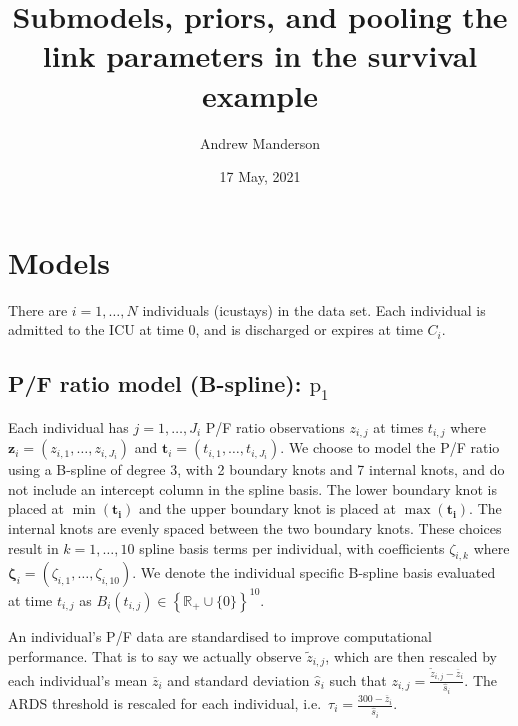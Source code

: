 \documentclass[
  10pt,
  a4paper,
]{article}
\title{Submodels, priors, and pooling the link parameters in the
survival example}
\author{Andrew Manderson}
\date{17 May, 2021}
\newcommand{\pd}{\text{p}}
\begin{document}
\maketitle

\hypertarget{models}{%
\section{Models}\label{models}}

There are \(i = 1, \ldots, N\) individuals (icustays) in the data set.
Each individual is admitted to the ICU at time \(0\), and is discharged
or expires at time \(C_{i}\).

\hypertarget{pf-ratio-model-b-spline-pd_1}{%
\subsection{\texorpdfstring{P/F ratio model (B-spline):
\(\pd_{1}\)}{P/F ratio model (B-spline): \textbackslash pd\_\{1\}}}\label{pf-ratio-model-b-spline-pd_1}}

Each individual has \(j = 1, \ldots, J_{i}\) P/F ratio observations
\(z_{i, j}\) at times \(t_{i, j}\) where
\(\boldsymbol{z}_{i} = (z_{i, 1}, \ldots, z_{i, J_{i}})\) and
\(\boldsymbol{t}_{i} = (t_{i, 1}, \ldots, t_{i, J_{i}})\). We choose to
model the P/F ratio using a B-spline of degree 3, with 2 boundary knots
and 7 internal knots, and do not include an intercept column in the
spline basis. The lower boundary knot is placed at
\(\min(\boldsymbol{t_{i}})\) and the upper boundary knot is placed at
\(\max(\boldsymbol{t_{i}})\). The internal knots are evenly spaced
between the two boundary knots. These choices result in
\(k = 1, \ldots, 10\) spline basis terms per individual, with
coefficients \(\zeta_{i, k}\) where
\(\boldsymbol{\zeta}_{i} = (\zeta_{i, 1}, \ldots, \zeta_{i, 10})\). We
denote the individual specific B-spline basis evaluated at time
\(t_{i, j}\) as
\(B_{i}(t_{i, j}) \in \left\{\mathbb{R}_{+} \cup \{0\}\right\}^{10}\).

An individual's P/F data are standardised to improve computational
performance. That is to say we actually observe \(\tilde{z}_{i, j}\),
which are then rescaled by each individual's mean \(\overline{z}_{i}\)
and standard deviation \(\hat{s}_{i}\) such that
\(z_{i, j} = \frac{\tilde{z}_{i, j} - \overline{z}_{i}}{\hat{s}_{i}}\).
The ARDS threshold is rescaled for each individual,
i.e.~\(\tau_{i} = \frac{300 - \overline{z}_{i}}{\hat{s}_{i}}\).
\end{document}
